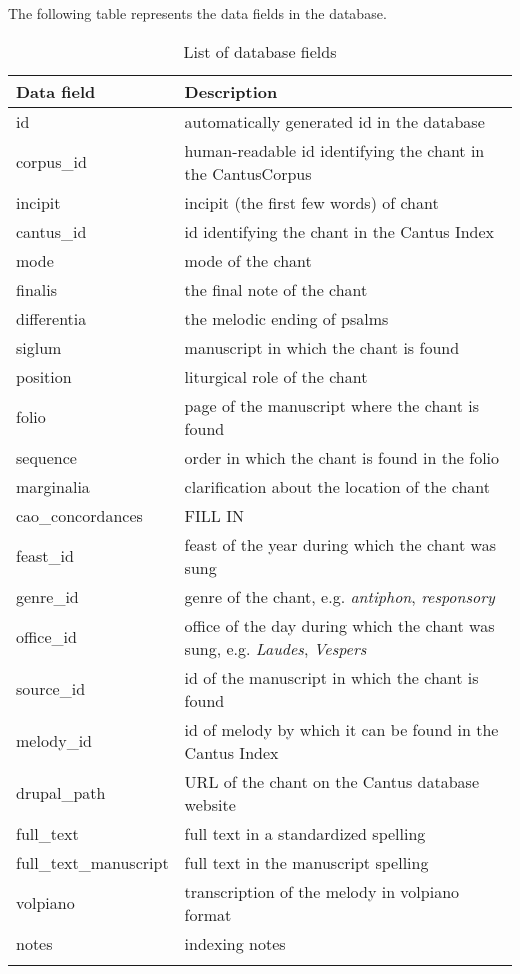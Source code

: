 The following table represents the data fields in the database.

\begin{longtable}{| p{} | p{} |} 

 \hline
 Data field & Description \\
 \hline
 id             & automatically generated id in the database \\ \hline
 corpus\_id     & human-readable id identifying the chant in the CantusCorpus \\ \hline
 incipit        & incipit (the first few words) of chant \\ \hline
 cantus\_id     & id identifying the chant in the Cantus Index \\ \hline
 mode           & mode of the chant \\ \hline
 finalis        & the final note of the chant \\ \hline
 differentia    & the melodic ending of psalms \\ \hline
 siglum         & manuscript in which the chant is found \\ \hline
 position       & liturgical role of the chant \\ \hline
 folio          & page of the manuscript where the chant is found \\ \hline
 sequence       & order in which the chant is found in the folio \\ \hline
 marginalia     & clarification about the location of the chant \\ \hline
 cao\_concordances & FILL IN \\ \hline
 feast\_id      & feast of the year during which the chant was sung \\ \hline
 genre\_id      & genre of the chant, e.g. \emph{antiphon}, \emph{responsory} \\ \hline
 office\_id     & office of the day during which the chant was sung, e.g. \emph{Laudes}, \emph{Vespers} \\ \hline
 source\_id     & id of the manuscript in which the chant is found \\ \hline
 melody\_id     & id of melody by which it can be found in the Cantus Index \\ \hline
 drupal\_path   & URL of the chant on the Cantus database website \\ \hline
 full\_text     & full text in a standardized spelling \\ \hline
 full\_text\_manuscript & full text in the manuscript spelling \\ \hline
 volpiano       & transcription of the melody in volpiano format \\ \hline
 notes          & indexing notes \\
 \hline

\caption{List of database fields}
\end{longtable}


